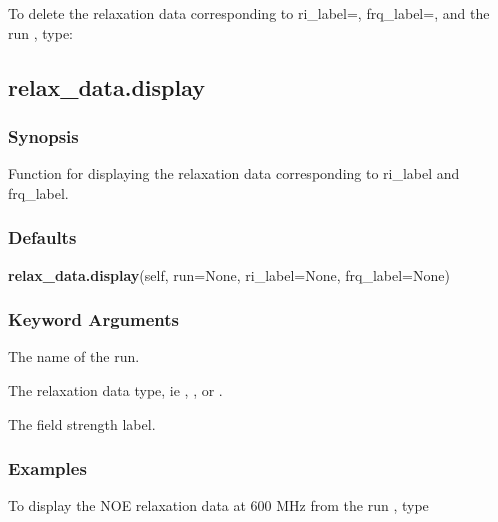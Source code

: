  To delete the relaxation data corresponding to ri\_label=, frq\_label=, and the run , type: 
  


  

 \newpage 

 \subsection{relax\_data.display} 

  
 \subsubsection{Synopsis} 

 Function for displaying the relaxation data corresponding to ri\_label and frq\_label. 
  

  
 \subsubsection{Defaults} 

 \textsf{\textbf{relax\_data.display}(self, run=None, ri\_label=None, frq\_label=None)} 

  
 \subsubsection{Keyword Arguments} 

   The name of the run.   

   The relaxation data type, ie , , or .   

   The field strength label.  

  

  
 \subsubsection{Examples} 

 To display the NOE relaxation data at 600 MHz from the run , type 
  


  

 \newpage 

